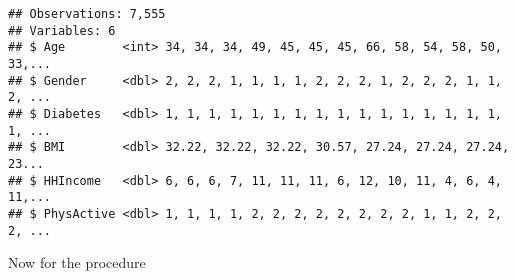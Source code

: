 \documentclass[]{article}
\newenvironment{Shaded}{\begin{snugshade}}{\end{snugshade}}
\newcommand{\KeywordTok}[1]{\textcolor[rgb]{0.13,0.29,0.53}{\textbf{#1}}}
\newcommand{\StringTok}[1]{\textcolor[rgb]{0.31,0.60,0.02}{#1}}
\newcommand{\CommentTok}[1]{\textcolor[rgb]{0.56,0.35,0.01}{\textit{#1}}}
\newcommand{\OperatorTok}[1]{\textcolor[rgb]{0.81,0.36,0.00}{\textbf{#1}}}
\newcommand{\NormalTok}[1]{#1}
\begin{document}
\begin{Shaded}
\end{Shaded}

\begin{verbatim}
## Observations: 7,555
## Variables: 6
## $ Age        <int> 34, 34, 34, 49, 45, 45, 45, 66, 58, 54, 58, 50, 33,...
## $ Gender     <dbl> 2, 2, 2, 1, 1, 1, 1, 2, 2, 2, 1, 2, 2, 2, 1, 1, 2, ...
## $ Diabetes   <dbl> 1, 1, 1, 1, 1, 1, 1, 1, 1, 1, 1, 1, 1, 1, 1, 1, 1, ...
## $ BMI        <dbl> 32.22, 32.22, 32.22, 30.57, 27.24, 27.24, 27.24, 23...
## $ HHIncome   <dbl> 6, 6, 6, 7, 11, 11, 11, 6, 12, 10, 11, 4, 6, 4, 11,...
## $ PhysActive <dbl> 1, 1, 1, 1, 2, 2, 2, 2, 2, 2, 2, 2, 1, 1, 2, 2, 2, ...
\end{verbatim}

Now for the procedure
\end{document}
